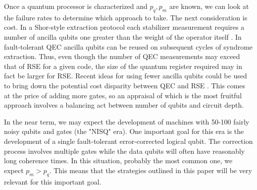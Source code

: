 \documentclass[reprint, superscriptaddress]{revtex4-1}
\numberwithin{equation}{section}
\numberwithin{figure}{section}
\numberwithin{table}{section}
\begin{document}
Once a quantum processor is characterized and $p_q, p_m$ are known, we can look at the failure rates to determine which approach to take. The next consideration is cost. In a Shor-style extraction protocol each stabilizer measurement requires a number of ancilla qubits one greater than the weight of the operator itself \cite{Shor1996}. In fault-tolerant QEC ancilla qubits can be reused on subsequent cycles of syndrome extraction. Thus, even though the number of QEC measurements may exceed that of RSE for a given code, the size of the quantum register required may in fact be larger for RSE. Recent ideas for using fewer ancilla qubits could be used to bring down the potential cost disparity between QEC and RSE \cite{Chao2018}. This comes at the price of adding more gates, so an appraisal of which is the most fruitful approach involves a balancing act between number of qubits and circuit depth. 

In the near term, we may expect the development of machines with 50-100 fairly noisy qubits and gates (the "NISQ" era).  One important goal for this era is the development of a single fault-tolerant error-corrected logical qubit.  The correction process involves multiple gates while the data qubits will often have reasonably long coherence times.  In this situation, probably the most common one, we expect $p_m > p_q$.  This means that the strategies outlined in this paper will be very relevant for this important goal.        




\end{document}
